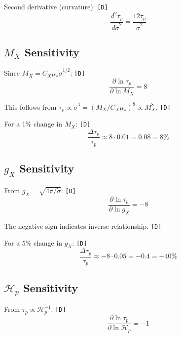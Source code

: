 \documentclass[11pt,a4paper]{article}
\newcommand{\tagD}{\textcolor{green!50!black}{\texttt{[D]}}}
\theoremstyle{definition}
\begin{document}
Second derivative (curvature): \tagD{}
\begin{equation}
\label{eq:sens-sigma-curv}
\frac{d^2\tau_p}{d\tilde{\sigma}^2} = \frac{12\tau_p}{\tilde{\sigma}^2}
\end{equation}

\subsection{$M_X$ Sensitivity}
\label{app:mx-sens}

Since $M_X = C_X\mu_*\tilde{\sigma}^{1/2}$: \tagD{}
\begin{equation}
\label{eq:sens-mx-1}
\frac{\partial \ln\tau_p}{\partial \ln M_X} = 8
\end{equation}

This follows from $\tau_p \propto \tilde{\sigma}^4 = (M_X/C_X\mu_*)^8 \propto M_X^8$. \tagD{}

For a 1\% change in $M_X$: \tagD{}
\begin{equation}
\label{eq:sens-mx-2}
\frac{\Delta\tau_p}{\tau_p} \approx 8 \cdot 0.01 = 0.08 = 8\%
\end{equation}

\subsection{$g_X$ Sensitivity}
\label{app:gx-sens}

From $g_X = \sqrt{4\pi/\tilde{\sigma}}$: \tagD{}
\begin{equation}
\label{eq:sens-gx-1}
\frac{\partial \ln\tau_p}{\partial \ln g_X} = -8
\end{equation}

The negative sign indicates inverse relationship. \tagD{}

For a 5\% change in $g_X$: \tagD{}
\begin{equation}
\label{eq:sens-gx-2}
\frac{\Delta\tau_p}{\tau_p} \approx -8 \cdot 0.05 = -0.4 = -40\%
\end{equation}

\subsection{$\mathcal{H}_p$ Sensitivity}
\label{app:hp-sens}

From $\tau_p \propto \mathcal{H}_p^{-1}$: \tagD{}
\begin{equation}
\label{eq:sens-hp-1}
\frac{\partial \ln\tau_p}{\partial \ln \mathcal{H}_p} = -1
\end{equation}
\end{document}

